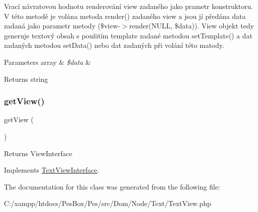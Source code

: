 Vrací návratovou hodnotu renderování view zadaného jako prametr konstruktoru. V této metodě je volána metoda render() zadaného view a jsou jí předána data zadaná jako parametr metody (\$view-\/$>$render(N\+U\+LL, \$data)). View objekt tedy generuje textový obsah s použitím template zadané metodou set\+Template() a dat zadaných metodou set\+Data() nebo dat zadaných při volání této matody.


\begin{DoxyParams}[1]{Parameters}
array & {\em \$data} & \\
\hline
\end{DoxyParams}
\begin{DoxyReturn}{Returns}
string 
\end{DoxyReturn}
\mbox{\label{class_pes_1_1_dom_1_1_node_1_1_text_1_1_text_view_a50677812ea3f0258f7d03bbac5265413}} 
\subsubsection{\texorpdfstring{get\+View()}{getView()}}
{\footnotesize\ttfamily get\+View (\begin{DoxyParamCaption}{ }\end{DoxyParamCaption})}

\begin{DoxyReturn}{Returns}
View\+Interface 
\end{DoxyReturn}


Implements \mbox{\hyperlink{interface_pes_1_1_dom_1_1_node_1_1_text_1_1_text_view_interface_a50677812ea3f0258f7d03bbac5265413}{Text\+View\+Interface}}.



The documentation for this class was generated from the following file\+:\begin{DoxyCompactItemize}
\item 
C\+:/xampp/htdocs/\+Pes\+Box/\+Pes/src/\+Dom/\+Node/\+Text/Text\+View.\+php\end{DoxyCompactItemize}
